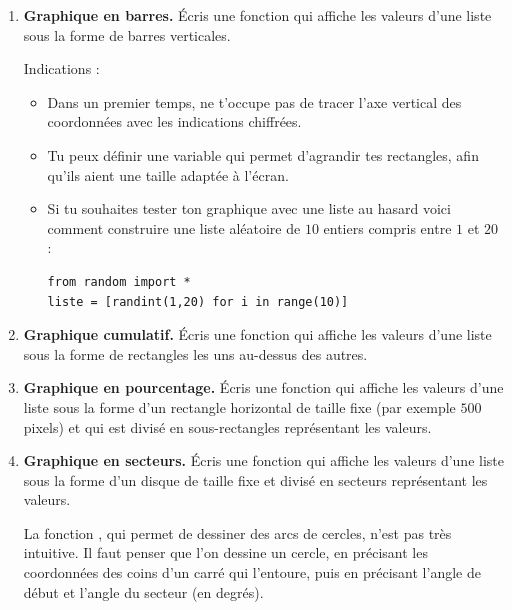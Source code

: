 \documentclass[11pt,class=report,crop=false]{standalone}
\begin{document}
\begin{activite}[Graphiques]
\begin{enumerate}
  \item \textbf{Graphique en barres.} Écris une fonction  qui affiche les valeurs d'une liste sous la forme de barres verticales.
  


 Indications :
  \begin{itemize}
    \item Dans un premier temps, ne t'occupe pas de tracer l'axe vertical des coordonnées avec les indications chiffrées.
    \item Tu peux définir une variable  qui permet d'agrandir tes rectangles, afin qu'ils aient une taille adaptée à l'écran.
    \item Si tu souhaites tester ton graphique avec une liste au hasard voici comment construire une liste aléatoire de $10$ entiers compris entre $1$ et $20$ :
    
\begin{lstlisting}
from random import *
liste = [randint(1,20) for i in range(10)]
\end{lstlisting}

\end{itemize}

  \item \textbf{Graphique cumulatif.} Écris une fonction  qui affiche les valeurs d'une liste sous la forme de rectangles les uns au-dessus des autres.
  

  
  \item \textbf{Graphique en pourcentage.} Écris une fonction  qui affiche les valeurs d'une liste sous la forme d'un rectangle horizontal de taille fixe (par exemple $500$ pixels) et qui est divisé en sous-rectangles représentant les valeurs.
  


  \item \textbf{Graphique en secteurs.} Écris une fonction  qui affiche les valeurs d'une liste sous la forme d'un disque de taille fixe et divisé en secteurs représentant les valeurs. 
 
La fonction , qui permet de dessiner des arcs de cercles, n'est pas très intuitive. Il faut penser que l'on dessine un cercle, en précisant les coordonnées des coins d'un carré qui l'entoure, puis en précisant l'angle de début et l'angle du secteur (en degrés). 



\end{enumerate}
\end{activite}
\end{document}
